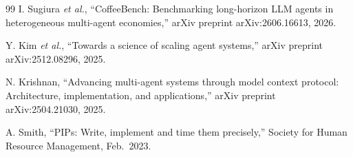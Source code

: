 \documentclass[conference]{IEEEtran}
\begin{document}
\begin{thebibliography}{99}
I. Sugiura \emph{et al.}, ``CoffeeBench: Benchmarking long-horizon LLM agents in
heterogeneous multi-agent economies,'' arXiv preprint arXiv:2606.16613, 2026.

Y. Kim \emph{et al.}, ``Towards a science of scaling agent systems,'' arXiv
preprint arXiv:2512.08296, 2025.

N. Krishnan, ``Advancing multi-agent systems through model context protocol:
Architecture, implementation, and applications,'' arXiv preprint
arXiv:2504.21030, 2025.

A. Smith, ``PIPs: Write, implement and time them precisely,'' Society for Human
Resource Management, Feb.~2023.

\end{thebibliography}
\end{document}
